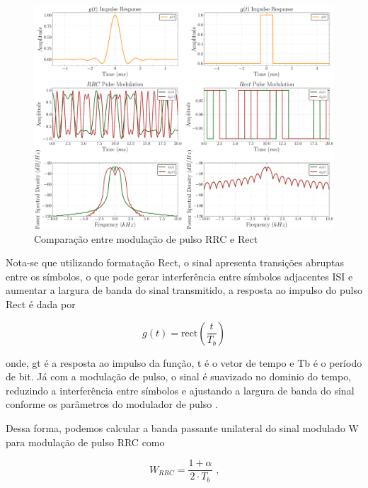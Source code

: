 \begin{figure}[H]
	\caption{Comparação entre modulação de pulso \gls{RRC} e \gls{Rect}}\label{fig:formatter_comp}
	\includegraphics[width=\linewidth]{assets/cap2/example_formatter_comp.pdf}
\end{figure}

Nota-se que utilizando formatação \gls{Rect}, o sinal apresenta transições abruptas entre os símbolos, o que pode gerar interferência entre símbolos adjacentes \gls{ISI} e aumentar a largura de banda do sinal transmitido, a resposta ao impulso do pulso \gls{Rect} é dada por

\vspace{-1em}
\begin{equation}
    g(t) = \text{rect}\left(\frac{t}{T_b}\right)
\end{equation}

\noindent onde, \gls{gt} é a resposta ao impulso da função, \gls{t} é o vetor de tempo e \gls{Tb} é o período de bit. Já com a modulação de pulso, o sinal é suavizado no dominio do tempo, reduzindo a interferência entre símbolos e ajustando a largura de banda do sinal conforme os parâmetros do modulador de pulso \cite{cnes_services_and_message_formats_ed2_rev2_2006,10555531840,rodrigues_demodulador_2018}.

Dessa forma, podemos calcular a banda passante unilateral do sinal modulado \gls{W} para modulação de pulso \gls{RRC} como 

\vspace{-1em}
\begin{equation}
    W_{RRC} = \frac{1 + \alpha}{2 \cdot T_b} \text{ ,}
\end{equation}

